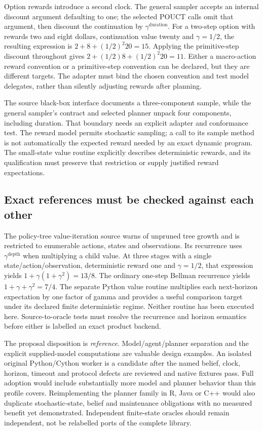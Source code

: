 Option rewards introduce a second clock. The general sampler accepts an
internal discount argument defaulting to one; the selected POUCT calls omit
that argument, then discount the continuation by $\gamma^{\text{duration}}$.
For a two-step option with rewards two and eight dollars, continuation value
twenty and $\gamma=1/2$, the resulting expression is $2+8+(1/2)^2 20=15$.
Applying the primitive-step discount throughout gives
$2+(1/2)8+(1/2)^2 20=11$. Either a macro-action reward convention or a
primitive-step convention can be declared, but they are different targets.
The adapter must bind the chosen convention and test model delegates, rather
than silently adjusting rewards after planning.
\cite{exec23_pomdppy_sources,exec23_pomdppy_reference}

The source black-box interface documents a three-component sample, while the
general sampler's contract and selected planner unpack four components,
including duration. That boundary needs an explicit adapter and conformance
test. The reward model permits stochastic sampling; a call to its sample method
is not automatically the expected reward needed by an exact dynamic program.
The small-state value routine explicitly describes deterministic rewards, and
its qualification must preserve that restriction or supply justified reward
expectations. \cite{exec23_pomdppy_sources}

\subsection{Exact references must be checked against each other}
\label{exec23:pomdppy-decision}
The policy-tree value-iteration source warns of unpruned tree growth and is
restricted to enumerable actions, states and observations. Its recurrence uses
$\gamma^{\text{depth}}$ when multiplying a child value. At three stages with a
single state/action/observation, deterministic reward one and $\gamma=1/2$, that
expression yields $1+\gamma(1+\gamma^2)=13/8$. The ordinary one-step Bellman
recurrence yields $1+\gamma+\gamma^2=7/4$. The separate Python value routine
multiplies each next-horizon expectation by one factor of gamma and provides
a useful comparison target under its declared finite deterministic regime.
Neither routine has been executed here. Source-to-oracle tests must resolve
the recurrence and horizon semantics before either is labelled an exact
product backend. \cite{exec23_pomdppy_sources,exec23_pomdppy_reference}

The proposal disposition is \emph{reference}. Model/agent/planner separation
and the explicit supplied-model computations are valuable design examples.
An isolated original Python/Cython worker is a candidate after the named belief,
clock, horizon, timeout and protocol defects are reviewed and native fixtures
pass. Full adoption would include substantially more model and planner behavior
than this profile covers. Reimplementing the planner family in R, Java or C++
would also duplicate stochastic-state, belief and maintenance obligations with
no measured benefit yet demonstrated. Independent finite-state oracles should
remain independent, not be relabelled ports of the complete library.

